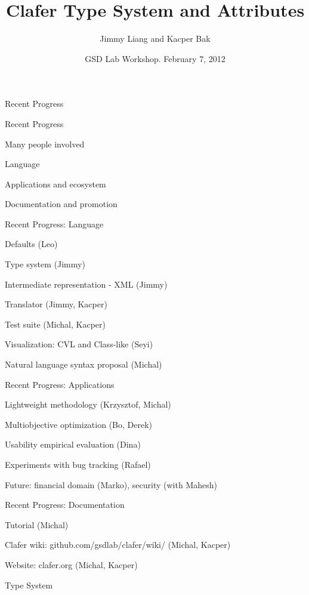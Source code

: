 \documentclass[table,15pt,t]{beamer}
\title{Clafer Type System and Attributes}
\author{Jimmy Liang and Kacper Bak}
\institute{\small Generative Software Development Lab\\University of Waterloo}
\date{GSD Lab Workshop. February 7, 2012}
\newcommand{\vmiddle}[1]{
  \vspace{\stretch{1}}
  #1
  \vspace{\stretch{1}}
}
\newcommand{\interframe}[1]{
\begin{frame}{}
\vmiddle{\hmiddle{\Huge #1}}
\end{frame}
}
\newcommand{\mlist}[1]{
\vmiddle{
  \begin{list}{}{}
    #1
  \end{list}
  }
}
\newcommand{\hmiddle}[1]{
  \begin{center}#1\end{center}
}
\begin{document}
\begin{frame}[plain]
  \vmiddle{\titlepage}
\end{frame}

\interframe{Recent Progress}

\begin{frame}{Recent Progress}
  \mlist{
  \item Many people involved
  \item Language
  \item Applications and ecosystem
  \item Documentation and promotion
  }
\end{frame}

\begin{frame}{Recent Progress: Language}
  \mlist{
  \item Defaults (Leo)
  \item Type system (Jimmy)
  \item Intermediate representation - XML (Jimmy)
  \item Translator (Jimmy, Kacper)
  \item Test suite (Michal, Kacper)
  \item Visualization: CVL and Class-like (Seyi)
  \item Natural language syntax proposal (Michal)
  }
\end{frame}

\begin{frame}{Recent Progress: Applications}
  \mlist{
  \item Lightweight methodology (Krzysztof, Michal)
  \item Multiobjective optimization (Bo, Derek)
  \item Usability empirical evaluation (Dina)
  \item Experiments with bug tracking (Rafael)
  \item Future: financial domain (Marko), security (with Mahesh)
  }
\end{frame}

\begin{frame}{Recent Progress: Documentation}
  \mlist{
  \item Tutorial (Michal)
  \item Clafer wiki: github.com/gsdlab/clafer/wiki/ (Michal, Kacper)
  \item Website: clafer.org (Michal, Kacper)
  }
\end{frame}

\interframe{Type System}
\end{document}
